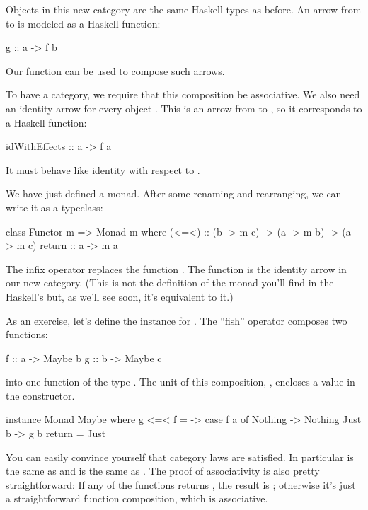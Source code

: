 \documentclass[DaoFP]{subfiles}
\begin{document}
Objects in this new category are the same Haskell types as before. An arrow from  to  is modeled as a Haskell function:
\begin{haskell}
g :: a -> f b
\end{haskell}
Our function  can be used to compose such arrows. 

To have a category, we require that this composition be associative. We also need an identity arrow for every object . This is an arrow from  to , so it corresponds to a Haskell function:
\begin{haskell}
idWithEffects :: a -> f a
\end{haskell}
It must behave like identity with respect to .

We have just defined a monad. After some renaming and rearranging, we can write it as a typeclass:
\begin{haskell}
class Functor m => Monad m where
  (<=<) :: (b -> m c) -> (a -> m b) -> (a -> m c)
  return :: a -> m a
\end{haskell}
The infix operator \hask{<=<} replaces the function . The  function is the identity arrow in our new category. (This is not the definition of the monad you'll find in the Haskell's  but, as we'll see soon, it's equivalent to it.)

As an exercise, let's define the  instance for . The ``fish'' operator \hask{<=<} composes two functions:
\begin{haskell}
f :: a -> Maybe b
g :: b -> Maybe c
\end{haskell}
into one function of the type . The unit of this composition, , encloses a value in the  constructor.
\begin{haskell}
instance Monad Maybe where
  g <=< f = \a -> case f a of
                    Nothing -> Nothing
                    Just b -> g b
  return = Just  
\end{haskell}

You can easily convince yourself that category laws are satisfied. In particular  is the same as  and  is the same as . The proof of associativity is also pretty straightforward: If any of the functions returns , the result is ; otherwise it's just a straightforward function composition, which is associative.
\end{document}
